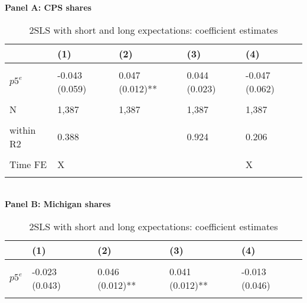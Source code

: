 \begin{table}[!htbp] \centering
\caption{2SLS with short and long expectations: coefficient estimates}
\label{tab:table:2sls:shortlong:stage2}
\textbf{Panel A: CPS shares} \\ 
\begin{tabular}{lllll}
\toprule
 & (1) & (2) & (3) & (4)\\
\midrule
\cellcolor{gray!10}{$p^e$} & \cellcolor{gray!10}{0.547 (0.070)***} & \cellcolor{gray!10}{0.299 (0.044)***} & \cellcolor{gray!10}{0.302 (0.050)***} & \cellcolor{gray!10}{0.731 (0.143)**}\\
$p5^e$ & -0.043 (0.059) & 0.047 (0.012)** & 0.044 (0.023) & -0.047 (0.062)\\
\cellcolor{gray!10}{$u^r$} & \cellcolor{gray!10}{-0.163 (0.079)} & \cellcolor{gray!10}{-0.014 (0.017)} & \cellcolor{gray!10}{-0.016 (0.037)} & \cellcolor{gray!10}{0.030 (0.080)}\\
N & 1,387 & 1,387 & 1,387 & 1,387\\
\cellcolor{gray!10}{R2} & \cellcolor{gray!10}{0.937} & \cellcolor{gray!10}{0.924} & \cellcolor{gray!10}{0.925} & \cellcolor{gray!10}{0.913}\\
\addlinespace
within R2 & 0.388 &  & 0.924 & 0.206\\
\cellcolor{gray!10}{Region FE} & \cellcolor{gray!10}{X} & \cellcolor{gray!10}{} & \cellcolor{gray!10}{X} & \cellcolor{gray!10}{}\\
Time FE & X &  &  & X\\
\cellcolor{gray!10}{SE} & \cellcolor{gray!10}{by: REGION} & \cellcolor{gray!10}{by: REGION} & \cellcolor{gray!10}{by: REGION} & \cellcolor{gray!10}{by: REGION}\\
\bottomrule
\end{tabular} \vspace{5mm} 
\\ \textbf{Panel B: Michigan shares} \\ 
\begin{tabular}{lllll}
\toprule
 & (1) & (2) & (3) & (4)\\
\midrule
\cellcolor{gray!10}{$p^e$} & \cellcolor{gray!10}{0.354 (0.079)**} & \cellcolor{gray!10}{0.269 (0.037)***} & \cellcolor{gray!10}{0.271 (0.033)***} & \cellcolor{gray!10}{0.378 (0.090)**}\\
$p5^e$ & -0.023 (0.043) & 0.046 (0.012)** & 0.041 (0.012)** & -0.013 (0.046)\\
\cellcolor{gray!10}{$u^r$} & \cellcolor{gray!10}{-0.136 (0.055)*} & \cellcolor{gray!10}{-0.009 (0.019)} & \cellcolor{gray!10}{-0.009 (0.034)} & \cellcolor{gray!10}{0.017 (0.052)}\\

\end{tabular}
\end{table}

